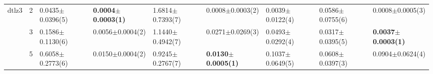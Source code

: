 \begin{table*}[htbp]
\begin{adjustbox}{width=1.0\textwidth,center}
\begin{tabular}{lllllllll}
dtlz3 & 2                              & 0.0435$\pm$0.0396(5)         & \textbf{0.0004$\pm$0.0003(1)} & 1.6814$\pm$0.7393(7)              & 0.0008$\pm$0.0003(2)          & 0.0039$\pm$0.0122(4)                              & 0.0586$\pm$0.0755(6)                     & 0.0008$\pm$0.0005(3)          \\
      & 3                              & 0.1586$\pm$0.1130(6)         & 0.0056$\pm$0.0004(2)          & 1.1440$\pm$0.4942(7)              & 0.0271$\pm$0.0269(3)          & 0.0493$\pm$0.0292(4)                              & 0.0317$\pm$0.0395(5)                     & \textbf{0.0037$\pm$0.0003(1)} \\
      & 5                              & 0.6058$\pm$0.2773(6)         & 0.0150$\pm$0.0004(2)          & 0.9245$\pm$0.2767(7)              & \textbf{0.0130$\pm$0.0005(1)} & 0.1037$\pm$0.0649(5)                              & 0.0608$\pm$0.0397(3)                     & 0.0904$\pm$0.0624(4)          \\

\end{tabular}
\end{adjustbox}
\end{table*}
